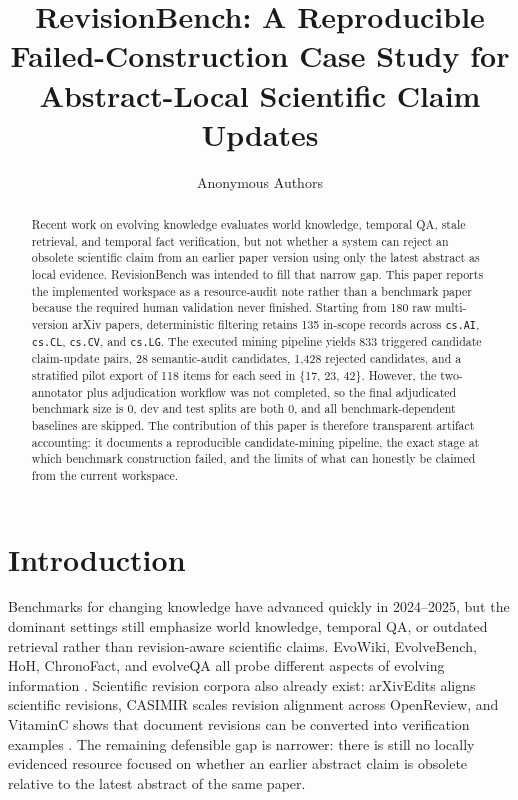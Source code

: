 \documentclass{article}
\title{RevisionBench: A Reproducible Failed-Construction Case Study for Abstract-Local Scientific Claim Updates}
\author{Anonymous Authors}
\begin{document}
\maketitle

\begin{abstract}
Recent work on evolving knowledge evaluates world knowledge, temporal QA, stale retrieval, and temporal fact verification, but not whether a system can reject an obsolete scientific claim from an earlier paper version using only the latest abstract as local evidence. RevisionBench was intended to fill that narrow gap. This paper reports the implemented workspace as a resource-audit note rather than a benchmark paper because the required human validation never finished. Starting from 180 raw multi-version arXiv papers, deterministic filtering retains 135 in-scope records across \texttt{cs.AI}, \texttt{cs.CL}, \texttt{cs.CV}, and \texttt{cs.LG}. The executed mining pipeline yields 833 triggered candidate claim-update pairs, 28 semantic-audit candidates, 1{,}428 rejected candidates, and a stratified pilot export of 118 items for each seed in \{17, 23, 42\}. However, the two-annotator plus adjudication workflow was not completed, so the final adjudicated benchmark size is 0, dev and test splits are both 0, and all benchmark-dependent baselines are skipped. The contribution of this paper is therefore transparent artifact accounting: it documents a reproducible candidate-mining pipeline, the exact stage at which benchmark construction failed, and the limits of what can honestly be claimed from the current workspace.
\end{abstract}

\section{Introduction}

Benchmarks for changing knowledge have advanced quickly in 2024--2025, but the dominant settings still emphasize world knowledge, temporal QA, or outdated retrieval rather than revision-aware scientific claims. EvoWiki, EvolveBench, HoH, ChronoFact, and evolveQA all probe different aspects of evolving information \citep{Tang2025EvoWiki,Ouyang2025HoH,Zhu2025EvolveBench,Barik2025ChronoFact,Nakshatri2025When}. Scientific revision corpora also already exist: arXivEdits aligns scientific revisions, CASIMIR scales revision alignment across OpenReview, and VitaminC shows that document revisions can be converted into verification examples \citep{jiang-etal-2022-arxivedits,jourdan-etal-2024-casimir,Schuster2021Get}. The remaining defensible gap is narrower: there is still no locally evidenced resource focused on whether an earlier abstract claim is obsolete relative to the latest abstract of the same paper.
\end{document}
